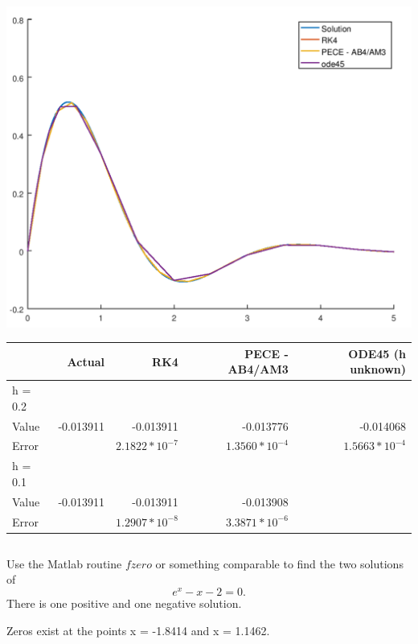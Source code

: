\documentclass{jhwhw}
\begin{document}
\solution
    \begin{center}
	\includegraphics[scale=0.95]{p1_0_2}

	\begin{tabular}[pos]{|l|r|r|r|r|}
	    \hline
	    & Actual	& RK4			& PECE - AB4/AM3	& ODE45 (h unknown) \\ \hline
	    h = 0.2 &&&& \\ \hline
	    Value	& -0.013911	& -0.013911		& -0.013776  & -0.014068 \\ \hline
	    Error	& 		& $2.1822*10^{-7}$	& $1.3560*10^{-4}$ & $1.5663*10^{-4}$\\ \hline
	    h = 0.1 &&&& \\ \hline
	    Value	& -0.013911	& -0.013911		& -0.013908 & \\ \hline
	    Error	& 		& $1.2907*10^{-8}$	& $3.3871*10^{-6}$ & \\ \hline
	\end{tabular}
    \end{center}

    \inputminted[linenos,frame=lines,framesep=2mm]{octave}{p2.m}

\problem{}

    Use the Matlab routine $fzero$ or something comparable to find the two solutions of
    $$ e^x - x - 2 = 0.$$
    There is one positive and one negative solution.

\solution
    
    Zeros exist at the points x = -1.8414 and x = 1.1462.
    \inputminted[linenos,frame=lines,framesep=2mm]{octave}{p3.m}
\end{document}
